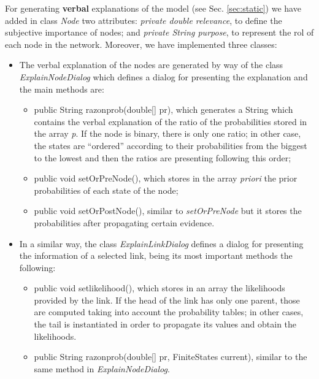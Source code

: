 For generating \textbf{verbal} explanations of the model (see Sec.
\ref{sec:static}) we have added in class \emph{Node} two
attributes: \emph{private double relevance}, to define the
subjective importance of nodes; and \emph{private String purpose},
to represent the rol of each node in the network. Moreover, we
have implemented three classes:\begin{itemize}
\item The
verbal explanation of the nodes are generated by way of the class
\emph{ExplainNodeDialog} which defines a dialog for presenting the
explanation and the main methods are:
\begin{itemize} \item public String razonprob(double[] pr), which
generates a String which contains the verbal explanation of the
ratio of the probabilities stored in the array \emph{p}. If the
node is binary, there is only one ratio; in other case, the states
are ``ordered'' according to their probabilities from the biggest
to the lowest and then the ratios are presenting following this
order;
\item public void setOrPreNode(), which stores in the array \emph{priori} the
prior probabilities of each state of the node;
\item public void setOrPostNode(), similar to \emph{setOrPreNode}
but it stores the probabilities after propagating certain
evidence.
\end{itemize}

\item In a similar way, the class \emph{ExplainLinkDialog} defines a
dialog for presenting the information of a selected link, being
its most important methods the following:
\begin{itemize}
  \item public void setlikelihood(), which stores in an array the
  likelihoods provided by the link. If the head of the link has
  only one parent, those are computed taking into account the
  probability tables; in other cases, the tail is instantiated in
  order to propagate its values and obtain the likelihoods.
  \item public String razonprob(double[] pr, FiniteStates
  current), similar to the same method in
  \emph{ExplainNodeDialog}.
\end{itemize}


\end{itemize}
